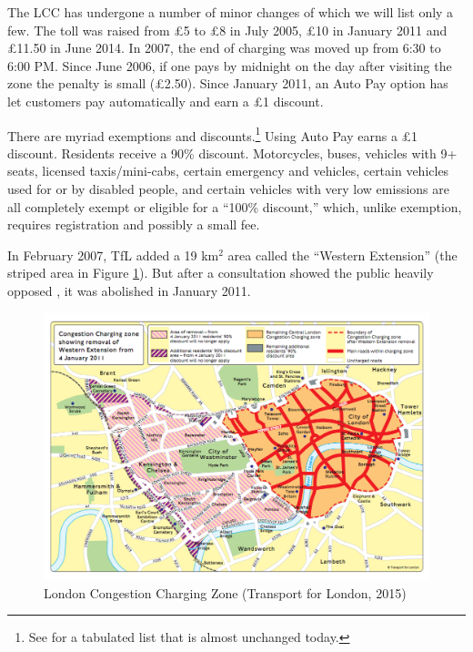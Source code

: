 The LCC has undergone a number of minor changes of which we will list only a few. The toll was raised from \pounds5 to \pounds8 in July 2005, \pounds10 in January 2011 and \pounds11.50 in June 2014. In 2007, the end of charging was moved up from 6:30 to 6:00 PM. Since June 2006, if one pays by midnight on the day after visiting the zone the penalty is small (\pounds 2.50). Since January 2011, an Auto Pay option has let customers pay automatically and earn a \pounds 1 discount.

There are myriad exemptions and discounts.\footnote{See \citet[Table 1, p. 515]{Santos2005} for a tabulated list that is almost unchanged today.} Using Auto Pay earns a \pounds1 discount. Residents receive a 90\% discount. Motorcycles, buses, vehicles with 9+ seats, licensed taxis/mini-cabs, certain emergency and vehicles, certain vehicles used for or by  disabled people, and certain vehicles with very low emissions are all completely exempt or eligible for a ``100\% discount,'' which, unlike exemption, requires registration and possibly a small fee.

In February 2007, TfL added a 19 km$^{2}$ area called the ``Western Extension'' (the striped area in Figure \ref{fig:London-Congestion-Charging}). But after a consultation showed the public heavily opposed \citep{TfL2008b}, it was abolished in January 2011.

\begin{figure}[ht]
\includegraphics[width=0.95\linewidth]{../img/london-congestion-charge.png}

\caption{London Congestion Charging Zone (Transport for London, 2015)\label{fig:London-Congestion-Charging}}
\end{figure}

